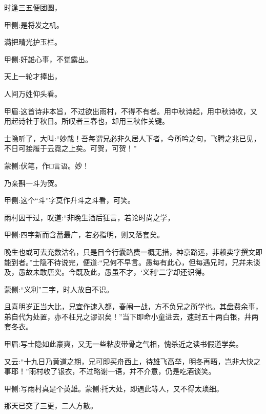 \begin{poem}
    \begin{pl}时逢三五便团圆，\end{pl}\begin{note}甲侧:是将发之机。\end{note}

    \begin{pl}满把晴光护玉栏。\end{pl}\begin{note}甲侧:奸雄心事，不觉露出。\end{note}

    \begin{pl}天上一轮才捧出，\end{pl}

    \begin{pl}人间万姓仰头看。\end{pl}\begin{note}甲眉:这首诗非本旨，不过欲出雨村，不得不有者。用中秋诗起，用中秋诗收，又用起诗社于秋日。所叹者三春也，却用三秋作关键。\end{note}
\end{poem}


\begin{parag}
    士隐听了，大叫:“妙哉！吾每谓兄必非久居人下者，今所吟之句，飞腾之兆已见，不日可接履于云霓之上矣。可贺，可贺！”\begin{note}蒙侧:伏笔，作□言语。妙！\end{note}乃亲斟一斗为贺。\begin{note}甲侧:这个“斗”字莫作升斗之斗看，可笑。\end{note}雨村因干过，叹道:“非晚生酒后狂言，若论时尚之学，\begin{note}甲侧:四字新而含蓄最广，若必指明，则又落套矣。\end{note}晚生也或可去充数沽名，只是目今行囊路费一概无措，神京路远，非赖卖字撰文即能到者。”士隐不待说完，便道:“兄何不早言。愚每有此心，但每遇兄时，兄幷未谈及，愚故未敢唐突。今既及此，愚虽不才，‘义利’二字却还识得。\begin{note}蒙侧:“义利”二字，时人故自不识。\end{note}且喜明岁正当大比，兄宜作速入都，春闱一战，方不负兄之所学也。其盘费余事，弟自代为处置，亦不枉兄之谬识矣！”当下即命小童进去，速封五十两白银，幷两套冬衣。\begin{note}甲眉:写士隐如此豪爽，又无一些粘皮带骨之气相，愧杀近之读书假道学矣。\end{note}又云:“十九日乃黄道之期，兄可即买舟西上，待雄飞高举，明冬再晤，岂非大快之事耶！”雨村收了银衣，不过略谢一语，幷不介意，仍是吃酒谈笑。\begin{note}甲侧:写雨村真是个英雄。蒙侧:托大处，即遇此等人，又不得太琐细。\end{note}那天已交了三更，二人方散。
\end{parag}


